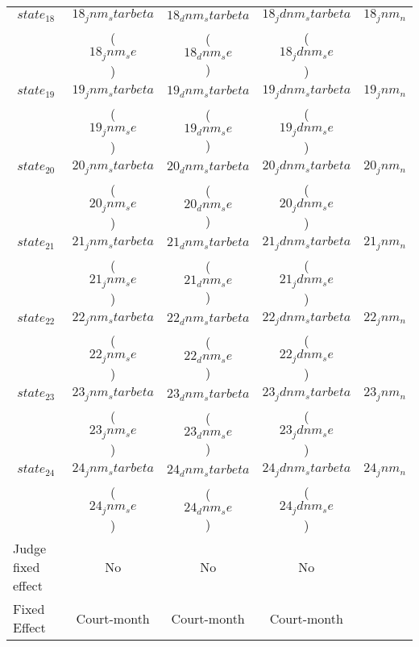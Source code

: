 {\begin{tabular}{l*{4}{c}}
$$state_18$$ \hspace{15mm} & $$18_jnm_starbeta$$ & $$18_dnm_starbeta$$ & $$18_jdnm_starbeta$$ & $$18_jnm_n$$ \\
                           & ($$18_jnm_se$$)     & ($$18_dnm_se$$)     & ($$18_jdnm_se$$)                    \\[2.5mm]
\hline

$$state_19$$ \hspace{15mm} & $$19_jnm_starbeta$$ & $$19_dnm_starbeta$$ & $$19_jdnm_starbeta$$ & $$19_jnm_n$$ \\
                           & ($$19_jnm_se$$)     & ($$19_dnm_se$$)     & ($$19_jdnm_se$$)                    \\[2.5mm]
\hline

$$state_20$$\hspace{15mm} & $$20_jnm_starbeta$$ & $$20_dnm_starbeta$$ & $$20_jdnm_starbeta$$ & $$20_jnm_n$$ \\
                          & ($$20_jnm_se$$)     & ($$20_dnm_se$$)     & ($$20_jdnm_se$$)                    \\[2.5mm]
\hline

$$state_21$$ \hspace{15mm} & $$21_jnm_starbeta$$ & $$21_dnm_starbeta$$ & $$21_jdnm_starbeta$$ & $$21_jnm_n$$ \\
                           & ($$21_jnm_se$$)     & ($$21_dnm_se$$)     & ($$21_jdnm_se$$)                    \\[2.5mm]
\hline

$$state_22$$ \hspace{15mm} & $$22_jnm_starbeta$$ & $$22_dnm_starbeta$$ & $$22_jdnm_starbeta$$ & $$22_jnm_n$$ \\
                           & ($$22_jnm_se$$)     & ($$22_dnm_se$$)     & ($$22_jdnm_se$$)                    \\[2.5mm]
\hline

$$state_23$$ \hspace{15mm} & $$23_jnm_starbeta$$ & $$23_dnm_starbeta$$ & $$23_jdnm_starbeta$$ & $$23_jnm_n$$ \\
                           & ($$23_jnm_se$$)     & ($$23_dnm_se$$)     & ($$23_jdnm_se$$)                    \\[2.5mm]
\hline

$$state_24$$ \hspace{15mm} & $$24_jnm_starbeta$$ & $$24_dnm_starbeta$$ & $$24_jdnm_starbeta$$ & $$24_jnm_n$$ \\
                           & ($$24_jnm_se$$)     & ($$24_dnm_se$$)     & ($$24_jdnm_se$$)                    \\[2.5mm]
\hline

Judge fixed effect & No          & No          & No          \\
Fixed Effect       & Court-month & Court-month & Court-month \\
\hline\hline
\end{tabular}
}
 
